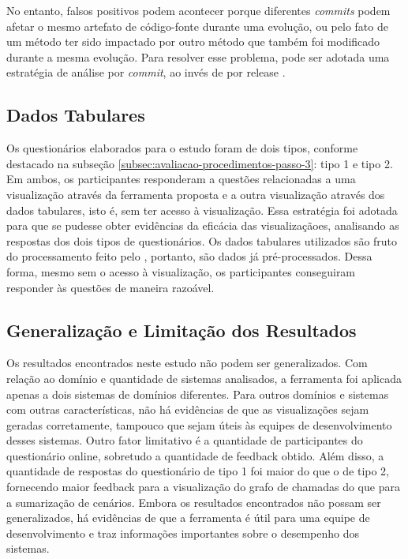 No entanto, falsos positivos podem acontecer porque diferentes \textit{commits} podem afetar o mesmo artefato de código-fonte durante uma evolução, ou pelo fato de um método ter sido impactado por outro método que também foi modificado durante a mesma evolução. Para resolver esse problema, pode ser adotada uma estratégia de análise por \textit{commit}, ao invés de por release \cite{Pinto2015}.

\subsection{Dados Tabulares}

Os questionários elaborados para o estudo foram de dois tipos, conforme destacado na subseção \ref{subsec:avaliacao-procedimentos-passo-3}: tipo 1 e tipo 2. Em ambos, os participantes responderam a questões relacionadas a uma visualização através da ferramenta proposta e a outra visualização através dos dados tabulares, isto é, sem ter acesso à visualização. Essa estratégia foi adotada para que se pudesse obter evidências da eficácia das visualizaçãoes, analisando as respostas dos dois tipos de questionários. Os dados tabulares utilizados são fruto do processamento feito pelo \textit{\perfMinerName}, portanto, são dados já pré-processados. Dessa forma, mesmo sem o acesso à visualização, os participantes conseguiram responder às questões de maneira razoável.

\subsection{Generalização e Limitação dos Resultados}

Os resultados encontrados neste estudo não podem ser generalizados. Com relação ao domínio e quantidade de sistemas analisados, a ferramenta foi aplicada apenas a dois sistemas de domínios diferentes. Para outros domínios e sistemas com outras características, não há evidências de que as visualizações sejam geradas corretamente, tampouco que sejam úteis às equipes de desenvolvimento desses sistemas. Outro fator limitativo é a quantidade de participantes do questionário online, sobretudo a quantidade de feedback obtido. Além disso, a quantidade de respostas do questionário de tipo 1 foi maior do que o de tipo 2, fornecendo maior feedback para a visualização do grafo de chamadas do que para a sumarização de cenários. Embora os resultados encontrados não possam ser generalizados, há evidências de que a ferramenta é útil para uma equipe de desenvolvimento e traz informações importantes sobre o desempenho dos sistemas.